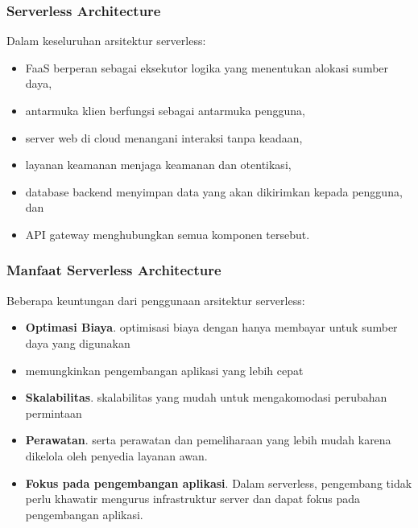 \documentclass[aspectratio=169, table]{beamer}
\begin{document}
    \begin{frame}\frametitle{Serverless Architecture}
        Dalam keseluruhan arsitektur serverless:
        \begin{itemize}
            \item FaaS berperan sebagai eksekutor logika yang menentukan alokasi sumber daya,
            \item antarmuka klien berfungsi sebagai antarmuka pengguna,
            \item server web di cloud menangani interaksi tanpa keadaan,
            \item layanan keamanan menjaga keamanan dan otentikasi,
            \item database backend menyimpan data yang akan dikirimkan kepada pengguna, dan
            \item API gateway menghubungkan semua komponen tersebut.
        \end{itemize}
    \end{frame}


    \begin{frame}\frametitle{Manfaat Serverless Architecture}
        \vspace{20pt}
        Beberapa keuntungan dari penggunaan arsitektur serverless:
        \begin{itemize}
            \item \textbf{Optimasi Biaya}. optimisasi biaya dengan hanya membayar untuk sumber daya yang digunakan
            \item memungkinkan pengembangan aplikasi yang lebih cepat
            \item \textbf{Skalabilitas}. skalabilitas yang mudah untuk mengakomodasi perubahan permintaan
            \item \textbf{Perawatan}. serta perawatan dan pemeliharaan yang lebih mudah karena dikelola oleh penyedia layanan awan.
            \item \textbf{Fokus pada pengembangan aplikasi}. Dalam serverless, pengembang tidak perlu khawatir mengurus infrastruktur server dan dapat fokus pada pengembangan aplikasi.
        \end{itemize}
    \end{frame}
\end{document}
